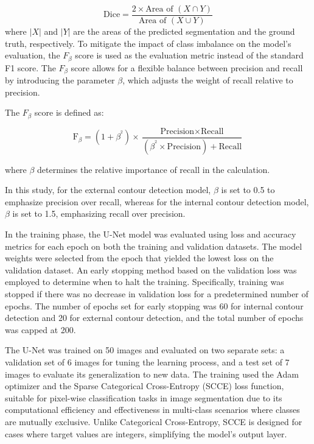 \documentclass[preprint,12pt]{elsarticle}
\begin{document}
\begin{itemize}
{\begin{equation}
\text{Dice} = \frac{2 \times \text{Area of } (X \cap Y)}{\text{Area of } (X \cup Y)}
\end{equation}
where $|X|$ and $|Y|$ are the areas of the predicted segmentation and the ground truth, respectively.
To mitigate the impact of class imbalance on the model's evaluation, the \( F_{\beta} \) score is used as the evaluation metric instead of the standard F1 score. The \( F_{\beta} \) score allows for a flexible balance between precision and recall by introducing the parameter \(\beta\), which adjusts the weight of recall relative to precision.}

The \( F_{\beta} \) score is defined as:

\[
\text{F}_{\beta} = (1 + \beta^{^2}) \times \frac{\text{Precision} \times \text{Recall}}{(\beta^{^2} \times \text{Precision}) + \text{Recall}}
\]

where \(\beta\) determines the relative importance of recall in the calculation.

In this study, for the external contour detection model, \(\beta\) is set to 0.5 to emphasize precision over recall, whereas for the internal contour detection model, \(\beta\) is set to 1.5, emphasizing recall over precision.


In the training phase, the U-Net model was evaluated using loss and accuracy metrics for each epoch on both the training and validation datasets.
The model weights were selected from the epoch that yielded the lowest loss on the validation dataset.
An early stopping method based on the validation loss was employed to determine when to halt the training.
Specifically, training was stopped if there was no decrease in validation loss for a predetermined number of epochs.
The number of epochs set for early stopping was 60 for internal contour detection and 20 for external contour detection, and the total number of epochs was capped at 200.

The U-Net was trained on 50 images and evaluated on two separate sets: a validation set of 6 images for tuning the learning process, and a test set of 7 images to evaluate its generalization to new data. The training used the Adam optimizer and the Sparse Categorical Cross-Entropy (SCCE) loss function, suitable for pixel-wise classification tasks in image segmentation due to its computational efficiency and effectiveness in multi-class scenarios where classes are mutually exclusive. Unlike Categorical Cross-Entropy, SCCE is designed for cases where target values are integers, simplifying the model's output layer.


\end{itemize}
\end{document}
